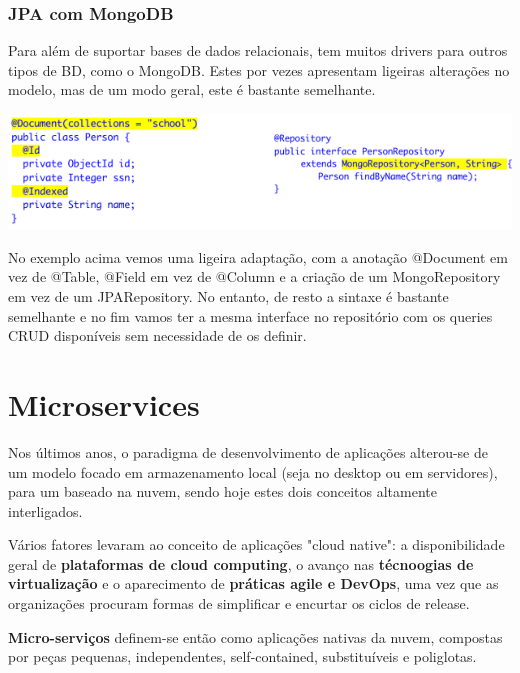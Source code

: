 \documentclass{article}
\begin{document}
\subsubsection*{JPA com MongoDB}

Para além de suportar bases de dados relacionais, tem muitos drivers para outros tipos de BD,
como o MongoDB. Estes por vezes apresentam ligeiras alterações no modelo, mas de um
modo geral, este é bastante semelhante.

\begin{center}
  \includegraphics[scale=0.8]{103}
\end{center}

No exemplo acima vemos uma ligeira adaptação, com a anotação @Document em vez de @Table,
@Field em vez de @Column e a criação de um
MongoRepository em vez de um JPARepository. No entanto, de resto a sintaxe é bastante semelhante e no fim vamos
ter a mesma interface no repositório com os queries CRUD disponíveis sem necessidade de os definir.

\pagebreak

\section{Microservices}

Nos últimos anos, o paradigma de desenvolvimento de aplicações alterou-se de um modelo
focado em armazenamento local (seja no desktop ou em servidores), para um baseado na
nuvem, sendo hoje estes dois conceitos altamente interligados.

Vários fatores levaram ao conceito de aplicações "cloud native":
a disponibilidade geral de \textbf{plataformas de cloud computing},
o avanço nas \textbf{técnoogias de virtualização} e o aparecimento
de \textbf{práticas agile e DevOps}, uma vez que as organizações
procuram formas de simplificar e encurtar os ciclos de release.

\begin{flushleft}
  \textbf{Micro-serviços} definem-se então como aplicações nativas da nuvem, compostas por peças
  pequenas, independentes, self-contained, substituíveis e poliglotas.
\end{flushleft}
\end{document}
